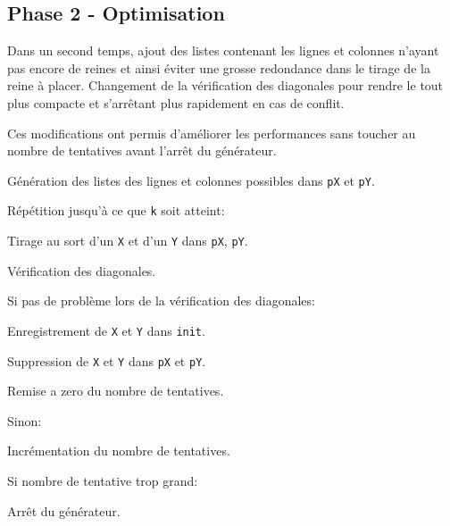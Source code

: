 \documentclass[a4paper, 10pt]{article}
\begin{document}
            \subsection{Phase 2 - Optimisation}
                Dans un second temps, ajout des listes contenant les lignes et colonnes n'ayant pas encore de reines et ainsi éviter une grosse redondance dans le tirage de la reine à placer. Changement de la vérification des diagonales pour rendre le tout plus compacte et s'arrêtant plus rapidement en cas de conflit.

                Ces modifications ont permis d'améliorer les performances sans toucher au nombre de tentatives avant l'arrêt du générateur.

    			\begin{description}
    				\item Génération des listes des lignes et colonnes possibles dans \verb?pX? et \verb?pY?.
    				\item Répétition jusqu'à ce que \verb?k? soit atteint:
    				\begin{description}
    					\item Tirage au sort d'un \verb?X? et d'un \verb?Y? dans \verb?pX?, \verb?pY?.
    					\item Vérification des diagonales.
    					\item Si pas de problème lors de la vérification des diagonales:
    					\begin{description}
    						\item Enregistrement de \verb?X? et \verb?Y? dans \verb?init?.
    						\item Suppression de \verb?X? et \verb?Y? dans \verb?pX? et \verb?pY?.
                            \item Remise a zero du nombre de tentatives.
    					\end{description}
                        \item Sinon:
                        \begin{description}
                            \item Incrémentation du nombre de tentatives.
                            \item Si nombre de tentative trop grand:
                            \begin{description}
                                \item Arrêt du générateur.
                            \end{description}
                        \end{description}
    				\end{description}
    			\end{description}
\end{document}
